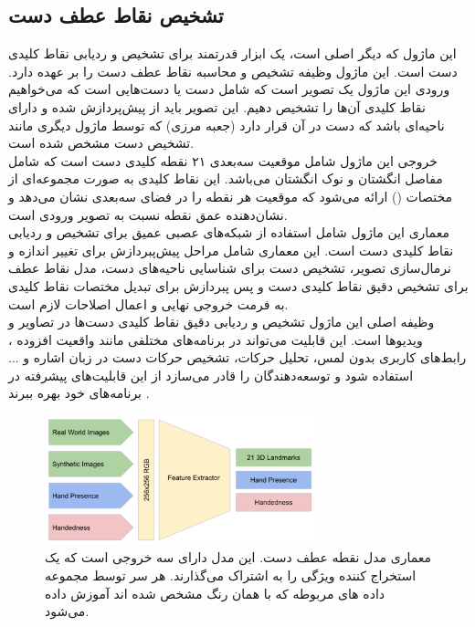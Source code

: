 \subsection{تشخیص نقاط عطف دست\protect{}}
این ماژول که دیگر اصلی است،  یک ابزار قدرتمند برای تشخیص و ردیابی نقاط کلیدی دست است. این ماژول وظیفه تشخیص و محاسبه نقاط عطف دست را بر عهده دارد. ورودی این ماژول یک تصویر است که شامل دست یا دست‌هایی 
است که می‌خواهیم نقاط کلیدی آن‌ها را تشخیص دهیم. این تصویر باید از پیش‌پردازش شده و دارای ناحیه‌ای باشد که دست در آن قرار دارد  (جعبه مرزی) که توسط ماژول دیگری مانند تشخیص دست مشخص شده است.
\\
خروجی این ماژول شامل موقعیت سه‌بعدی ۲۱ نقطه کلیدی دست است که شامل مفاصل انگشتان و نوک انگشتان می‌باشد. این نقاط کلیدی به صورت مجموعه‌ای از مختصات () ارائه می‌شود 
که موقعیت هر نقطه را در فضای سه‌بعدی نشان می‌دهد و  نشان‌دهنده عمق نقطه نسبت به تصویر ورودی است.
\\
معماری این ماژول شامل استفاده از شبکه‌های عصبی عمیق برای تشخیص و ردیابی نقاط کلیدی دست است. این معماری شامل مراحل پیش‌پبردازش برای تغییر اندازه و نرمال‌سازی تصویر، تشخیص دست برای شناسایی ناحیه‌های دست، مدل 
نقاط عطف برای تشخیص دقیق نقاط کلیدی دست و پس‌ پبردازش برای تبدیل مختصات نقاط کلیدی به فرمت خروجی نهایی و اعمال اصلاحات لازم است.
\\
وظیفه اصلی این ماژول تشخیص و ردیابی دقیق نقاط کلیدی دست‌ها در تصاویر و ویدیوها است. این قابلیت می‌تواند در برنامه‌های مختلفی مانند واقعیت افزوده ، رابط‌های کاربری بدون لمس،
تحلیل حرکات، تشخیص حرکات دست در زبان اشاره و ... استفاده شود و توسعه‌دهندگان را قادر می‌سازد از این قابلیت‌های پیشرفته در برنامه‌های خود بهره ببرند \cite{zhang2020mediapipe}.

\begin{figure}[h]
    \centering
    \includegraphics[width=0.7\textwidth]{landmark.png}
    \caption{معماری مدل نقطه عطف دست. این مدل دارای سه خروجی است که یک استخراج کننده ویژگی را به اشتراک می‌گذارند. هر سر توسط مجموعه داده های مربوطه که با همان رنگ مشخص شده اند آموزش داده می‌شود.}
\end{figure}


